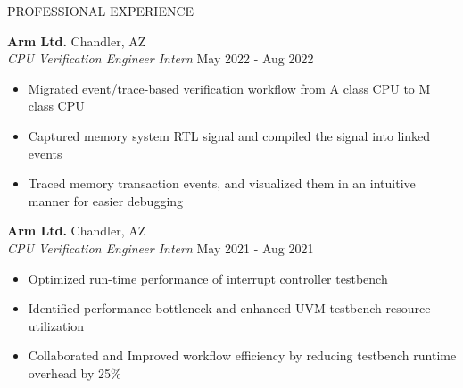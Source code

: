 \documentclass{resume} %
\begin{document}
  \begin{rSection}{PROFESSIONAL EXPERIENCE}

    \textbf{Arm Ltd.}                           \hfill Chandler, AZ\\
    \emph{CPU Verification Engineer Intern}     \hfill May 2022 - Aug 2022\\
    \LineShrinkBeforeItem
    \begin{itemize} [leftmargin=1em]
      \itemsep -0.6em
      \item Migrated event/trace-based verification workflow from A class CPU to M class CPU
      \item Captured memory system RTL signal and compiled the signal into linked events
      \item Traced memory transaction events, and visualized them in an intuitive manner for easier debugging
    \end{itemize}


    \textbf{Arm Ltd.}                           \hfill Chandler, AZ\\
    \emph{CPU Verification Engineer Intern}     \hfill May 2021 - Aug 2021\\
    \LineShrinkBeforeItem
    \begin{itemize} [leftmargin=1em]
      \itemsep -0.6em
      \item Optimized run-time performance of interrupt controller testbench
      \item Identified performance bottleneck and enhanced UVM testbench resource utilization
      \item Collaborated and Improved workflow efficiency by reducing testbench runtime overhead by 25\%
    \end{itemize}

  \end{rSection}


\end{document}
